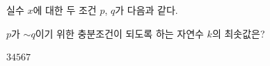 실수 $x$에 대한 두 조건 $p$, $q$가 다음과 같다. \par\smallskip{}\par\smallskip\noindent $p$가 $\sim q$이기 위한 충분조건이 되도록 하는 자연수 $k$의 최솟값은?
\begin{choices32}{$3$}{$4$}{$5$}{$6$}{$7$}\end{choices32}
